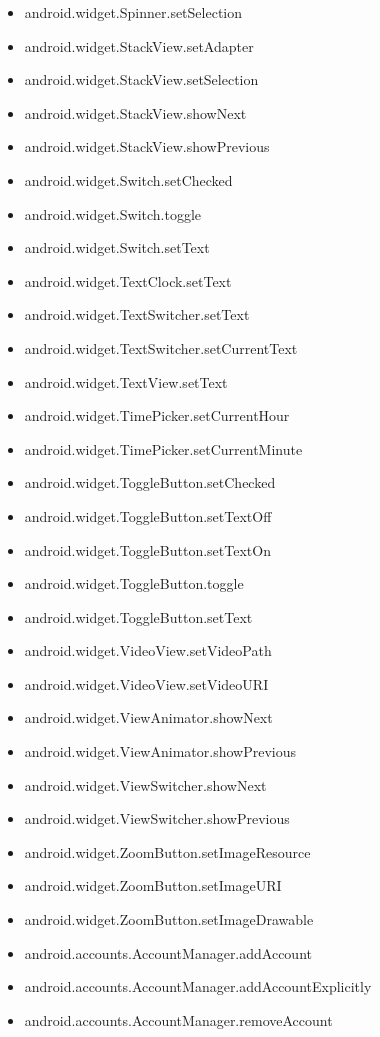 \documentclass{sig-alternate}
\begin{document}
\begin{itemize}
\item android.widget.Spinner.setSelection
\item android.widget.StackView.setAdapter
\item android.widget.StackView.setSelection
\item android.widget.StackView.showNext
\item android.widget.StackView.showPrevious
\item android.widget.Switch.setChecked
\item android.widget.Switch.toggle
\item android.widget.Switch.setText
\item android.widget.TextClock.setText
\item android.widget.TextSwitcher.setText
\item android.widget.TextSwitcher.setCurrentText
\item android.widget.TextView.setText
\item android.widget.TimePicker.setCurrentHour
\item android.widget.TimePicker.setCurrentMinute
\item android.widget.ToggleButton.setChecked
\item android.widget.ToggleButton.setTextOff
\item android.widget.ToggleButton.setTextOn
\item android.widget.ToggleButton.toggle
\item android.widget.ToggleButton.setText
\item android.widget.VideoView.setVideoPath
\item android.widget.VideoView.setVideoURI
\item android.widget.ViewAnimator.showNext
\item android.widget.ViewAnimator.showPrevious
\item android.widget.ViewSwitcher.showNext
\item android.widget.ViewSwitcher.showPrevious
\item android.widget.ZoomButton.setImageResource
\item android.widget.ZoomButton.setImageURI
\item android.widget.ZoomButton.setImageDrawable
\item android.accounts.AccountManager.addAccount
\item android.accounts.AccountManager.addAccountExplicitly
\item android.accounts.AccountManager.removeAccount

\end{itemize}
\end{document}
